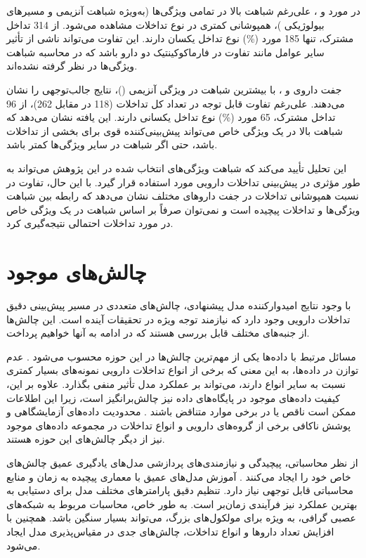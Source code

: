 در مورد  و ، علی‌رغم شباهت بالا در تمامی ویژگی‌ها (به‌ویژه شباهت آنزیمی  و مسیرهای بیولوژیکی )، همپوشانی کمتری در نوع تداخلات مشاهده می‌شود. از 314 تداخل مشترک، تنها 185 مورد (\%) نوع تداخل یکسان دارند. این تفاوت می‌تواند ناشی از تأثیر سایر عوامل مانند تفاوت در فارماکوکینتیک دو دارو باشد که در محاسبه شباهت ویژگی‌ها در نظر گرفته نشده‌اند.

جفت داروی  و ، با بیشترین شباهت در ویژگی آنزیمی ()، نتایج جالب‌توجهی را نشان می‌دهند. علی‌رغم تفاوت قابل توجه در تعداد کل تداخلات (118 در مقابل 262)، از 96 تداخل مشترک، 65 مورد (\%) نوع تداخل یکسانی دارند. این یافته نشان می‌دهد که شباهت بالا در یک ویژگی خاص می‌تواند پیش‌بینی‌کننده قوی برای بخشی از تداخلات باشد، حتی اگر شباهت در سایر ویژگی‌ها کمتر باشد.

این تحلیل تأیید می‌کند که شباهت ویژگی‌های انتخاب شده در این پژوهش می‌تواند به طور مؤثری در پیش‌بینی تداخلات دارویی مورد استفاده قرار گیرد. با این حال، تفاوت در نسبت همپوشانی تداخلات در جفت داروهای مختلف نشان می‌دهد که رابطه بین شباهت ویژگی‌ها و تداخلات پیچیده است و نمی‌توان صرفاً بر اساس شباهت در یک ویژگی خاص در مورد تداخلات احتمالی نتیجه‌گیری کرد.

\section{چالش‌های موجود}

با وجود نتایج امیدوارکننده مدل پیشنهادی، چالش‌های متعددی در مسیر پیش‌بینی دقیق تداخلات دارویی وجود دارد که نیازمند توجه ویژه در تحقیقات آینده است. این چالش‌ها از جنبه‌های مختلف قابل بررسی هستند که در ادامه به آنها خواهیم پرداخت.

مسائل مرتبط با داده‌ها یکی از مهم‌ترین چالش‌ها در این حوزه محسوب می‌شود \cite{ref_wang2017}. عدم توازن در داده‌ها، به این معنی که برخی از انواع تداخلات دارویی نمونه‌های بسیار کمتری نسبت به سایر انواع دارند، می‌تواند بر عملکرد مدل تأثیر منفی بگذارد. علاوه بر این، کیفیت داده‌های موجود در پایگاه‌های داده نیز چالش‌برانگیز است، زیرا این اطلاعات ممکن است ناقص یا در برخی موارد متناقض باشند \cite{ref_deng2020}. محدودیت داده‌های آزمایشگاهی و پوشش ناکافی برخی از گروه‌های دارویی و انواع تداخلات در مجموعه داده‌های موجود نیز از دیگر چالش‌های این حوزه هستند.

از نظر محاسباتی، پیچیدگی و نیازمندی‌های پردازشی مدل‌های یادگیری عمیق چالش‌های خاص خود را ایجاد می‌کنند \cite{ref_he2023}. آموزش مدل‌های عمیق با معماری پیچیده به زمان و منابع محاسباتی قابل توجهی نیاز دارد. تنظیم دقیق پارامترهای مختلف مدل برای دستیابی به بهترین عملکرد نیز فرآیندی زمان‌بر است. به طور خاص، محاسبات مربوط به شبکه‌های عصبی گرافی، به ویژه برای مولکول‌های بزرگ، می‌تواند بسیار سنگین باشد. همچنین با افزایش تعداد داروها و انواع تداخلات، چالش‌های جدی در مقیاس‌پذیری مدل ایجاد می‌شود.

